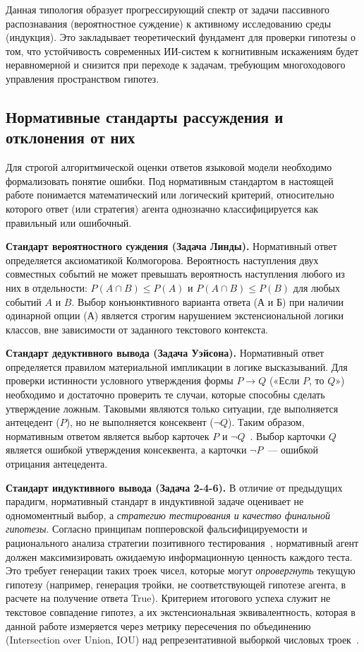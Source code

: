 Данная типология образует прогрессирующий спектр от задачи пассивного распознавания (вероятностное суждение) к активному исследованию среды (индукция). Это закладывает теоретический фундамент для проверки гипотезы о том, что устойчивость современных ИИ-систем к когнитивным искажениям будет неравномерной и снизится при переходе к задачам, требующим многоходового управления пространством гипотез.

\subsection{Нормативные стандарты рассуждения и отклонения от них}

Для строгой алгоритмической оценки ответов языковой модели необходимо формализовать понятие ошибки. Под нормативным стандартом в настоящей работе понимается математический или логический критерий, относительно которого ответ (или стратегия) агента однозначно классифицируется как правильный или ошибочный. 

\textbf{Стандарт вероятностного суждения (Задача Линды).} 
Нормативный ответ определяется аксиоматикой Колмогорова. Вероятность наступления двух совместных событий не может превышать вероятность наступления любого из них в отдельности: $P(A \cap B) \leq P(A)$ и $P(A \cap B) \leq P(B)$ для любых событий $A$ и $B$. Выбор конъюнктивного варианта ответа (А и Б) при наличии одинарной опции (А) является строгим нарушением экстенсиональной логики классов, вне зависимости от заданного текстового контекста.

\textbf{Стандарт дедуктивного вывода (Задача Уэйсона).} 
Нормативный ответ определяется правилом материальной импликации в логике высказываний. Для проверки истинности условного утверждения формы $P \rightarrow Q$ («Если $P$, то $Q$») необходимо и достаточно проверить те случаи, которые способны сделать утверждение ложным. Таковыми являются только ситуации, где выполняется антецедент ($P$), но не выполняется консеквент ($\lnot Q$). Таким образом, нормативным ответом является выбор карточек $P$ и $\lnot Q$~\cite{wason1966reasoning}. Выбор карточки $Q$ является ошибкой утверждения консеквента, а карточки $\lnot P$~--- ошибкой отрицания антецедента.

\textbf{Стандарт индуктивного вывода (Задача 2-4-6).} 
В отличие от предыдущих парадигм, нормативный стандарт в индуктивной задаче оценивает не одномоментный выбор, а \textit{стратегию тестирования и качество финальной гипотезы}. 
Согласно принципам попперовской фальсифицируемости и рационального анализа стратегии позитивного тестирования~\cite{klayman1987confirmation}, нормативный агент должен максимизировать ожидаемую информационную ценность каждого теста. Это требует генерации таких троек чисел, которые могут \textit{опровергнуть} текущую гипотезу (например, генерация тройки, не соответствующей гипотезе агента, в расчете на получение ответа True). Критерием итогового успеха служит не текстовое совпадение гипотез, а их экстенсиональная эквивалентность, которая в данной работе измеряется через метрику пересечения по объединению (Intersection over Union, IOU) над репрезентативной выборкой числовых троек~\cite{banatt2024wilt}.


